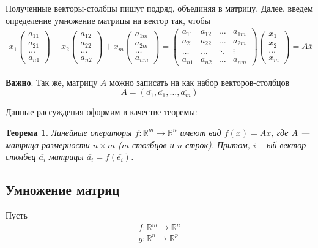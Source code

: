 \documentclass[]{article}
\newtheorem{thr}{Теорема}
\begin{document}
	 Полученные векторы-столбцы пишут подряд, объединяя в матрицу. Далее, введем определение умножение матрицы на вектор так, чтобы 
	\begin{gather*}
		x_1
	\begin{pmatrix}
		a_{11}
		\\
		a_{21}
		\\
		\ldots
		\\
		a_{n1}
	\end{pmatrix}
	+
	x_2
	\begin{pmatrix}
		a_{12}
		\\
		a_{22}
		\\
		\ldots
		\\
		a_{n2}
	\end{pmatrix}
	+
	x_m
	\begin{pmatrix}
		a_{1m}
		\\
		a_{2m}
		\\
		\ldots
		\\
		a_{nm}
	\end{pmatrix}
	=
	\begin{pmatrix}
		a_{11} & a_{12} & \ldots & a_{1m}
		\\
		a_{21} & a_{22} & \ldots & a_{2m}
		\\
		\ldots & \ldots & \ddots & \vdots
		\\
		a_{n1} & a_{n2} & \ldots & a_{nm}
	\end{pmatrix}
	\begin{pmatrix}
		x_{1}
		\\
		x_{2}
		\\
		\ldots
		\\
		x_{m}
	\end{pmatrix}
	=A\overline{x}
\end{gather*}

\textbf{Важно}. Так же, матрицу $A$ можно записать на как набор векторов-столбцов
\begin{equation*}
	A=(\overline{a_1},\overline{a_1},\ldots,\overline{a_m})
\end{equation*}

Данные рассуждения оформим в качестве теоремы:
\begin{thr}\label{th1}
	Линейные операторы $f:\mathbb{R}^m\rightarrow\mathbb{R}^n$ имеют вид $f(x)=Ax$, где $A$ --- матрица размерности $n\times m$ ($m$ столбцов и $n$ строк). Притом, $i-$ый вектор-столбец $\overline{a_i}$ матрицы $\overline{a_i}=f(\overline{e_i})$.
\end{thr}

\subsection{Умножение матриц}
Пусть \begin{gather*}
	f:\mathbb{R}^m\rightarrow\mathbb{R}^n
	\\
	g:\mathbb{R}^n\rightarrow\mathbb{R}^p
\end{gather*}
\end{document}
